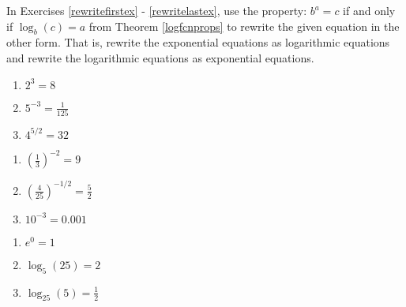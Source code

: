 \documentclass{ximera}
\begin{document}
	\author{Stitz-Zeager}


\label{ExercisesforLogarithmicFunctions}

\label{IntroExpLogsExercises}

In Exercises \ref{rewritefirstex} - \ref{rewritelastex}, use the property: $b^{a} = c$ if and only if $\log_{b}(c) = a$ from Theorem \ref{logfcnprops} to rewrite the given equation in the other form.  That is, rewrite the exponential equations as logarithmic equations and rewrite the logarithmic equations as exponential equations.

\begin{multicols}{3}
\begin{enumerate}

\item  $2^{3} = 8$ \label{rewritefirstex}

\item  $5^{-3} = \frac{1}{125}$  

\item  $4^{5/2} = 32$  

\setcounter{HW}{\value{enumi}}
\end{enumerate}
\end{multicols}

\begin{multicols}{3}
\begin{enumerate}
\setcounter{enumi}{\value{HW}}

\item  $\left(\frac{1}{3}\right)^{-2} = 9$  

\item  $\left(\frac{4}{25}\right)^{-1/2} = \frac{5}{2}$  

\item  $10^{-3} = 0.001$ 

\setcounter{HW}{\value{enumi}}
\end{enumerate}
\end{multicols}

\begin{multicols}{3}
\begin{enumerate}
\setcounter{enumi}{\value{HW}}

\item  $e^{0}  = 1$  

\item  $\log_{5}(25) = 2$  

\item  $\log_{25} (5) = \frac{1}{2}$  

\setcounter{HW}{\value{enumi}}
\end{enumerate}
\end{multicols}
\end{document}
